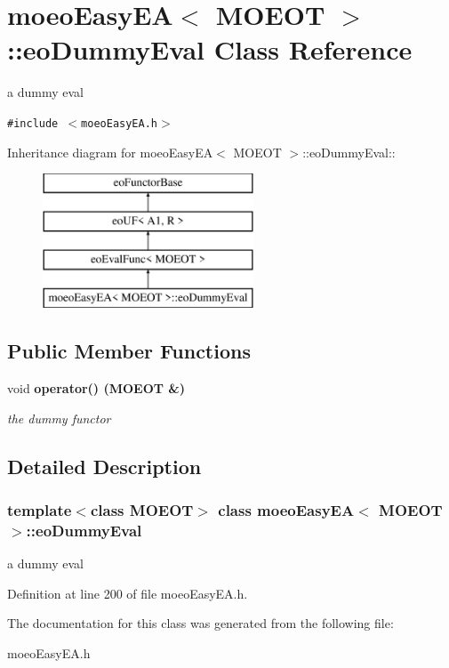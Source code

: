 \section{moeo\-Easy\-EA$<$ MOEOT $>$::eo\-Dummy\-Eval Class Reference}
\label{classmoeoEasyEA_1_1eoDummyEval}
a dummy eval  


{\tt \#include $<$moeo\-Easy\-EA.h$>$}

Inheritance diagram for moeo\-Easy\-EA$<$ MOEOT $>$::eo\-Dummy\-Eval::\begin{figure}[H]
\begin{center}
\leavevmode
\includegraphics[height=4cm]{classmoeoEasyEA_1_1eoDummyEval}
\end{center}
\end{figure}
\subsection*{Public Member Functions}
\begin{CompactItemize}
\item 
void \bf{operator()} (MOEOT \&)\label{classmoeoEasyEA_1_1eoDummyEval_1ed55869451f883db2fc43c60f7caff5}

\begin{CompactList}\small\item\em the dummy functor \item\end{CompactList}\end{CompactItemize}


\subsection{Detailed Description}
\subsubsection*{template$<$class MOEOT$>$ class moeo\-Easy\-EA$<$ MOEOT $>$::eo\-Dummy\-Eval}

a dummy eval 



Definition at line 200 of file moeo\-Easy\-EA.h.

The documentation for this class was generated from the following file:\begin{CompactItemize}
\item 
moeo\-Easy\-EA.h\end{CompactItemize}
